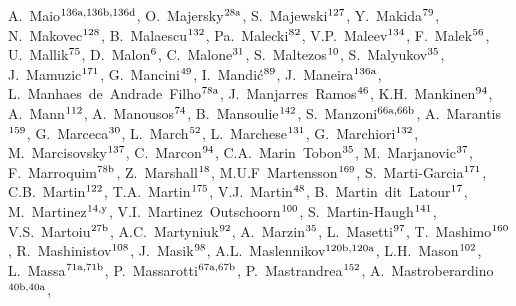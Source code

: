 \begin{flushleft}
A.~Maio$^\textrm{\scriptsize 136a,136b,136d}$,    
O.~Majersky$^\textrm{\scriptsize 28a}$,    
S.~Majewski$^\textrm{\scriptsize 127}$,    
Y.~Makida$^\textrm{\scriptsize 79}$,    
N.~Makovec$^\textrm{\scriptsize 128}$,    
B.~Malaescu$^\textrm{\scriptsize 132}$,    
Pa.~Malecki$^\textrm{\scriptsize 82}$,    
V.P.~Maleev$^\textrm{\scriptsize 134}$,    
F.~Malek$^\textrm{\scriptsize 56}$,    
U.~Mallik$^\textrm{\scriptsize 75}$,    
D.~Malon$^\textrm{\scriptsize 6}$,    
C.~Malone$^\textrm{\scriptsize 31}$,    
S.~Maltezos$^\textrm{\scriptsize 10}$,    
S.~Malyukov$^\textrm{\scriptsize 35}$,    
J.~Mamuzic$^\textrm{\scriptsize 171}$,    
G.~Mancini$^\textrm{\scriptsize 49}$,    
I.~Mandi\'{c}$^\textrm{\scriptsize 89}$,    
J.~Maneira$^\textrm{\scriptsize 136a}$,    
L.~Manhaes~de~Andrade~Filho$^\textrm{\scriptsize 78a}$,    
J.~Manjarres~Ramos$^\textrm{\scriptsize 46}$,    
K.H.~Mankinen$^\textrm{\scriptsize 94}$,    
A.~Mann$^\textrm{\scriptsize 112}$,    
A.~Manousos$^\textrm{\scriptsize 74}$,    
B.~Mansoulie$^\textrm{\scriptsize 142}$,    
S.~Manzoni$^\textrm{\scriptsize 66a,66b}$,    
A.~Marantis$^\textrm{\scriptsize 159}$,    
G.~Marceca$^\textrm{\scriptsize 30}$,    
L.~March$^\textrm{\scriptsize 52}$,    
L.~Marchese$^\textrm{\scriptsize 131}$,    
G.~Marchiori$^\textrm{\scriptsize 132}$,    
M.~Marcisovsky$^\textrm{\scriptsize 137}$,    
C.~Marcon$^\textrm{\scriptsize 94}$,    
C.A.~Marin~Tobon$^\textrm{\scriptsize 35}$,    
M.~Marjanovic$^\textrm{\scriptsize 37}$,    
F.~Marroquim$^\textrm{\scriptsize 78b}$,    
Z.~Marshall$^\textrm{\scriptsize 18}$,    
M.U.F~Martensson$^\textrm{\scriptsize 169}$,    
S.~Marti-Garcia$^\textrm{\scriptsize 171}$,    
C.B.~Martin$^\textrm{\scriptsize 122}$,    
T.A.~Martin$^\textrm{\scriptsize 175}$,    
V.J.~Martin$^\textrm{\scriptsize 48}$,    
B.~Martin~dit~Latour$^\textrm{\scriptsize 17}$,    
M.~Martinez$^\textrm{\scriptsize 14,y}$,    
V.I.~Martinez~Outschoorn$^\textrm{\scriptsize 100}$,    
S.~Martin-Haugh$^\textrm{\scriptsize 141}$,    
V.S.~Martoiu$^\textrm{\scriptsize 27b}$,    
A.C.~Martyniuk$^\textrm{\scriptsize 92}$,    
A.~Marzin$^\textrm{\scriptsize 35}$,    
L.~Masetti$^\textrm{\scriptsize 97}$,    
T.~Mashimo$^\textrm{\scriptsize 160}$,    
R.~Mashinistov$^\textrm{\scriptsize 108}$,    
J.~Masik$^\textrm{\scriptsize 98}$,    
A.L.~Maslennikov$^\textrm{\scriptsize 120b,120a}$,    
L.H.~Mason$^\textrm{\scriptsize 102}$,    
L.~Massa$^\textrm{\scriptsize 71a,71b}$,    
P.~Massarotti$^\textrm{\scriptsize 67a,67b}$,    
P.~Mastrandrea$^\textrm{\scriptsize 152}$,    
A.~Mastroberardino$^\textrm{\scriptsize 40b,40a}$,    

\end{flushleft}
